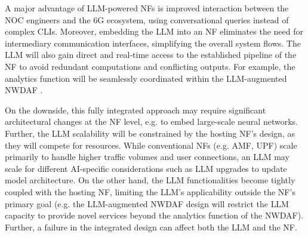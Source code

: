 A major advantage of \gls{LLM}-powered \glspl{NF} is improved interaction between the \gls{NOC} engineers and the 6G ecosystem, using conversational queries instead of complex \glspl{CLI}. Moreover, embedding the \gls{LLM} into an \gls{NF} eliminates the need for intermediary communication interfaces, simplifying the overall system flows. The \gls{LLM} will also gain direct and real-time access to the established pipeline of the \gls{NF} to avoid redundant computations and conflicting outputs. For example, the analytics function will be seamlessly coordinated within the \gls{LLM}-augmented \gls{NWDAF}  \cite{Kan2024mobile_llama}.

On the downside, this fully integrated approach may require significant architectural changes at the \gls{NF} level, e.g. to embed large-scale neural networks. Further, the \gls{LLM} scalability will be constrained by the hosting \gls{NF}'s design, as they will compete for resources. While conventional \glspl{NF} (e.g. \gls{AMF}, \gls{UPF}) scale primarily to handle higher traffic volumes and user connections, an \gls{LLM} may scale for different \gls{AI}-specific considerations such as \gls{LLM} upgrades to update model architecture. On the other hand, the \gls{LLM} functionalities become tightly coupled with the hosting \gls{NF}, limiting the \gls{LLM}'s applicability outside the \gls{NF}'s primary goal (e.g. the \gls{LLM}-augmented \gls{NWDAF} design \cite{Kan2024mobile_llama} will restrict the \gls{LLM} capacity to provide novel services beyond the analytics function of the \gls{NWDAF}). Further, a failure in the integrated design can affect both the \gls{LLM} and the \gls{NF}.

